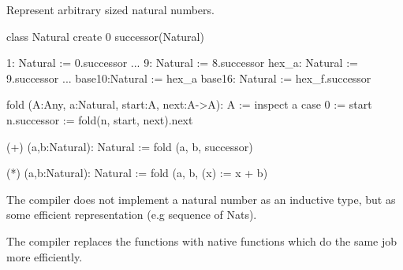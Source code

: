 Represent arbitrary sized natural numbers.
%
\begin{alba}
  class Natural create
    0
    successor(Natural)

  1: Natural := 0.successor
  ...
  9: Natural := 8.successor
  hex_a: Natural := 9.successor
  ...
  base10:Natural  := hex_a
  base16: Natural := hex_f.successor

  fold (A:Any, a:Natural, start:A, next:A->A): A :=
    inspect a case
      0 :=
         start
      n.successor :=
         fold(n, start, next).next

  (+) (a,b:Natural): Natural :=
    fold (a, b, successor)

  (*) (a,b:Natural): Natural :=
    fold (a, b, (x) := x + b)
\end{alba}

The compiler does not implement a natural number as an inductive type, but as
some efficient representation (e.g sequence of Nats).

The compiler replaces the functions  with native functions which do the same job more efficiently.



